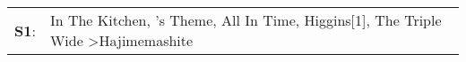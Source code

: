 \begin{supertabular}{p{0.03\textwidth}p{0.92\textwidth}}
 \textbf{S1}:  &  In The Kitchen\textsuperscript{}, 's Theme\textsuperscript{}, \enspace All In Time\textsuperscript{}, \enspace Higgins[1]\textsuperscript{}, \enspace The Triple Wide\textsuperscript{} \textgreater \enspace Hajimemashite\textsuperscript{}  \enspace  \\
\end{supertabular}
